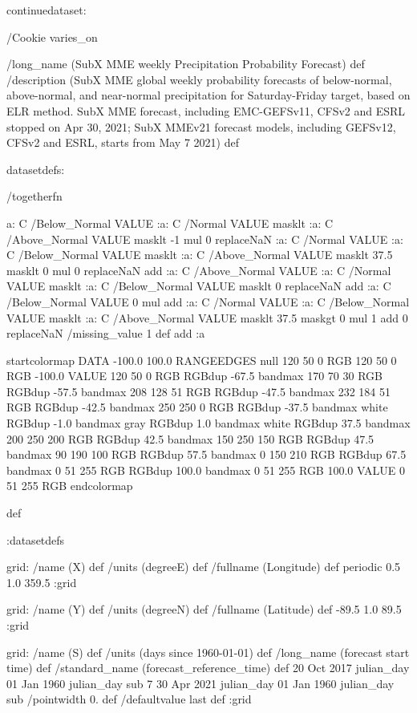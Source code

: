 \begin{ingrid}

continuedataset:



/Cookie varies_on


/long_name (SubX MME weekly Precipitation Probability Forecast) def
/description (SubX MME global weekly probability forecasts of below-normal, above-normal, and near-normal precipitation for Saturday-Friday target, based on ELR method. SubX MME forecast, including EMC-GEFSv11, CFSv2 and ESRL stopped on Apr 30, 2021; SubX MMEv21 forecast models, including GEFSv12, CFSv2 and ESRL, starts from May 7 2021) def

datasetdefs:

/togetherfn {
 a:
    C /Below_Normal VALUE
    :a:
     C /Normal VALUE
     masklt
    :a:
     C /Above_Normal VALUE
     masklt
    -1 mul
    0 replaceNaN
    :a:
     C /Normal VALUE
     :a:
      C /Below_Normal VALUE
      masklt
     :a:
      C /Above_Normal VALUE
      masklt
     37.5 masklt
     0 mul
     0 replaceNaN           
     add
    :a:
     C /Above_Normal VALUE
     :a:
      C /Normal VALUE
      masklt
     :a:
      C /Below_Normal VALUE
      masklt
     0 replaceNaN
     add
 :a:
     C /Below_Normal VALUE
     0 mul
     add
    :a:
     C /Normal VALUE
     :a:
      C /Below_Normal VALUE
      masklt
     :a:
      C /Above_Normal VALUE        
      masklt
     37.5 maskgt
     0 mul
     1 add
     0 replaceNaN
     /missing_value 1 def
     add
    :a

startcolormap
DATA -100.0 100.0 RANGEEDGES
null 120 50 0 RGB
120 50 0 RGB -100.0 VALUE
120 50 0 RGB RGBdup -67.5 bandmax
170 70 30 RGB RGBdup -57.5 bandmax
208 128 51 RGB RGBdup -47.5 bandmax
232 184 51 RGB RGBdup -42.5 bandmax
250 250 0 RGB RGBdup -37.5 bandmax
white RGBdup -1.0 bandmax
gray RGBdup 1.0 bandmax
white RGBdup 37.5 bandmax
200 250 200 RGB RGBdup 42.5 bandmax
150 250 150 RGB RGBdup 47.5 bandmax
90 190 100 RGB RGBdup 57.5 bandmax
0 150 210 RGB RGBdup 67.5 bandmax
0 51 255 RGB RGBdup 100.0 bandmax
0 51 255 RGB 100.0 VALUE
0 51 255 RGB
endcolormap
} def 

:datasetdefs


grid:
/name (X) def
/units (degreeE) def
/fullname (Longitude) def
periodic
0.5 1.0 359.5
:grid

grid:
/name (Y) def
/units (degreeN) def
/fullname (Latitude) def
-89.5 1.0 89.5
:grid


grid:
/name (S) def
/units (days since 1960-01-01) def
/long_name (forecast start time) def
/standard_name (forecast_reference_time) def
20 Oct 2017 julian_day 01 Jan 1960 julian_day sub
7
30 Apr 2021 julian_day 01 Jan 1960 julian_day sub
/pointwidth 0. def
/defaultvalue { last } def
:grid


\end{ingrid}
